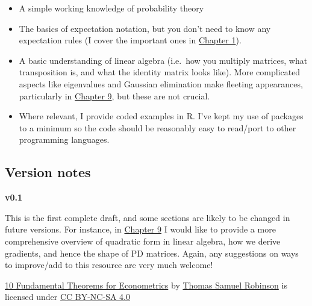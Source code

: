 \documentclass[
]{book}
\begin{document}
\begin{itemize}
\item
  A simple working knowledge of probability theory
\item
  The basics of expectation notation, but you don't need to know any expectation rules (I cover the important ones in \protect\hyperlink{exp_theorems}{Chapter 1}).
\item
  A basic understanding of linear algebra (i.e.~how you multiply matrices, what transposition is, and what the identity matrix looks like). More complicated aspects like eigenvalues and Gaussian elimination make fleeting appearances, particularly in \protect\hyperlink{pd}{Chapter 9}, but these are not crucial.
\item
  Where relevant, I provide coded examples in R. I've kept my use of packages to a minimum so the code should be reasonably easy to read/port to other programming languages.
\end{itemize}

\hypertarget{version-notes}{%
\subsection*{Version notes}\label{version-notes}}

\textbf{v0.1}

This is the first complete draft, and some sections are likely to be changed in future versions. For instance, in \protect\hyperlink{pd}{Chapter 9} I would like to provide a more comprehensive overview of quadratic form in linear algebra, how we derive gradients, and hence the shape of PD matrices. Again, any suggestions on ways to improve/add to this resource are very much welcome!

\href{https://ts-robinson.com/files/_10ET/index.html}{10 Fundamental Theorems for Econometrics} by \href{https://ts-robinson.com}{Thomas Samuel Robinson} is licensed under \href{https://creativecommons.org/licenses/by-nc-sa/4.0/}{CC BY-NC-SA 4.0}
\end{document}
